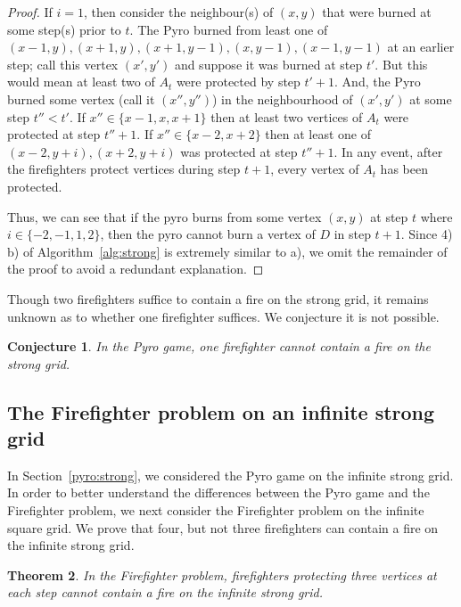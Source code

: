 \documentclass[12pt]{article}
\newtheorem{theorem}{Theorem}
\newtheorem{conjecture}[theorem]{Conjecture}
\begin{document}
\begin{proof}
If $i=1$, then consider the neighbour(s) of $(x,y)$ that were burned at some step(s) prior to $t$.  The Pyro burned from least one of $(x-1,y),(x+1,y),(x+1,y-1),(x,y-1),(x-1,y-1)$ at an earlier step; call this vertex $(x',y')$ and suppose it was burned at step $t'$.  But this would mean at least two of $A_t$ were protected by step $t'+1$.  And, the Pyro burned some vertex (call it $(x'',y'')$) in the neighbourhood of $(x',y')$ at some step $t''<t'$.  If $x'' \in \{x-1,x,x+1\}$ then at least two vertices of $A_t$ were protected at step $t''+1$.  If $x'' \in \{x-2,x+2\}$ then at least one of $(x-2,y+i),(x+2,y+i)$ was protected at step $t''+1$.  In any event, after the firefighters protect vertices during step $t+1$, every vertex of $A_t$ has been protected.\medskip

Thus, we can see that if the pyro burns from some vertex $(x,y)$ at step $t$ where $i \in \{-2,-1,1,2\}$, then the pyro cannot burn a vertex of $D$ in step $t+1$.  Since 4) b) of Algorithm~\ref{alg:strong} is extremely similar to a), we omit the remainder of the proof to avoid a redundant explanation.\end{proof} 

Though two firefighters suffice to contain a fire on the strong grid, it remains unknown as to whether one firefighter suffices. We conjecture it is not possible. 

\begin{conjecture}In the Pyro game, one firefighter cannot contain a fire on the strong grid.\end{conjecture} 





\subsection{The Firefighter problem on an infinite strong grid}

In Section~\ref{pyro:strong}, we considered the Pyro game on the infinite strong grid.  In order to better understand the differences between the Pyro game and the Firefighter problem, we next consider the Firefighter problem on the infinite square grid.  We prove that four, but not three firefighters can contain a fire on the infinite strong grid.

\begin{theorem} In the Firefighter problem, firefighters protecting three vertices at each step cannot contain a fire on the infinite strong grid.\end{theorem}
\end{document}
